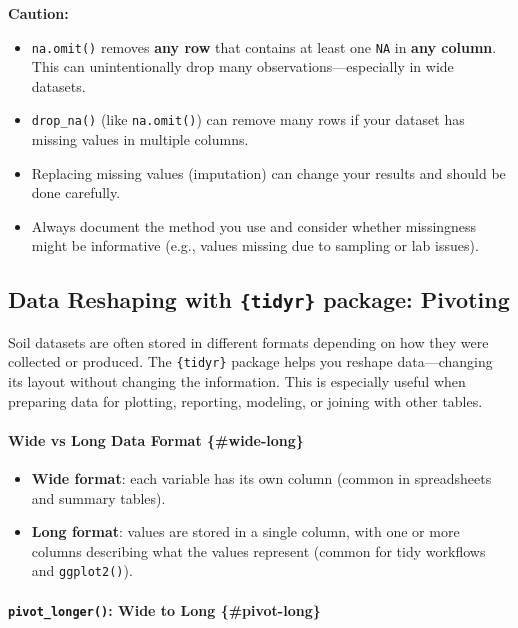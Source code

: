 \documentclass[
  10pt,
  b5paper,
  oneside]{book}
\begin{document}
\textbf{Caution:}

\begin{itemize}
\item
  \texttt{na.omit()} removes \textbf{any row} that contains at least one \texttt{NA} in \textbf{any column}. This can unintentionally drop many observations---especially in wide datasets.
\item
  \texttt{drop\_na()} (like \texttt{na.omit()}) can remove many rows if your dataset has missing values in multiple columns.
\item
  Replacing missing values (imputation) can change your results and should be done carefully.
\item
  Always document the method you use and consider whether missingness might be informative (e.g., values missing due to sampling or lab issues).
\end{itemize}

\subsection{\texorpdfstring{Data Reshaping with \texttt{\{tidyr\}} package: Pivoting}{Data Reshaping with \{tidyr\} package: Pivoting}}\label{pivoting}

Soil datasets are often stored in different formats depending on how they were collected or produced. The \texttt{\{tidyr\}} package helps you reshape data---changing its layout without changing the information. This is especially useful when preparing data for plotting, reporting, modeling, or joining with other tables.

\paragraph*{Wide vs Long Data Format \{\#wide-long\}}\label{wide-vs-long-data-format-wide-long}

\begin{itemize}
\item
  \textbf{Wide format}: each variable has its own column (common in spreadsheets and summary tables).
\item
  \textbf{Long format}: values are stored in a single column, with one or more columns describing what the values represent (common for tidy workflows and \texttt{ggplot2()}).
\end{itemize}

\paragraph*{\texorpdfstring{\texttt{pivot\_longer()}: Wide to Long \{\#pivot-long\}}{pivot\_longer(): Wide to Long \{\#pivot-long\}}}\label{pivot_longer-wide-to-long-pivot-long}
\end{document}
